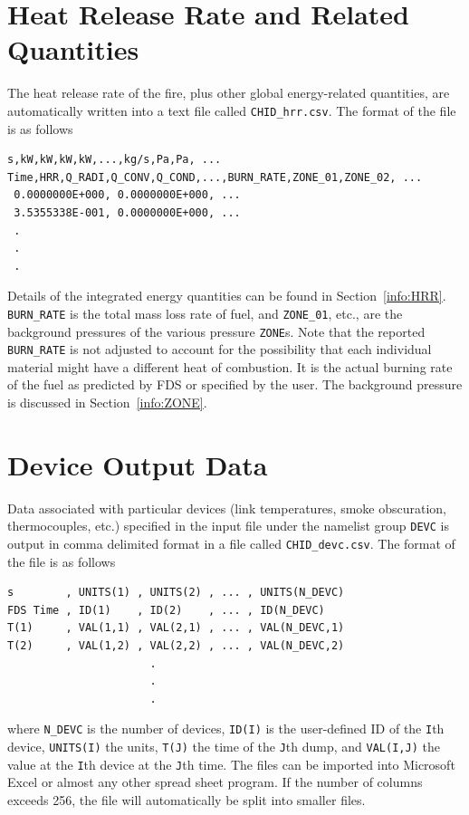 \documentclass[11pt]{book}
\newcommand{\ct}{\tt\small}
\begin{document}
\section{Heat Release Rate and Related Quantities}

\label{out:hrr}
The heat release rate of the fire, plus other global energy-related quantities, are automatically written into a text file
called {\ct CHID\_hrr.csv}. The format of the file is as follows

\footnotesize
\begin{verbatim}
s,kW,kW,kW,kW,...,kg/s,Pa,Pa, ...
Time,HRR,Q_RADI,Q_CONV,Q_COND,...,BURN_RATE,ZONE_01,ZONE_02, ...
 0.0000000E+000, 0.0000000E+000, ...
 3.5355338E-001, 0.0000000E+000, ...
 .
 .
 .
 \end{verbatim}
\normalsize

\noindent
Details of the integrated energy quantities can be found in Section~\ref{info:HRR}.
{\ct BURN\_RATE} is the total mass loss rate of fuel, and {\ct ZONE\_01}, etc., are the background pressures of the various
pressure {\ct ZONE}s. Note that the reported {\ct BURN\_RATE} is not adjusted to account for the possibility that each individual
material might have a different heat of combustion. It is the actual burning rate of the fuel as predicted by FDS or specified by the user.
The background pressure is discussed in Section~\ref{info:ZONE}.





\section{Device Output Data}
\label{out:DEVC}

Data associated with particular devices (link temperatures, smoke obscuration, thermocouples, etc.)
specified in the input file under the namelist
group {\ct DEVC} is output in comma delimited format in a file called
{\ct CHID\_devc.csv}. The format of the file is as follows

\footnotesize
\begin{verbatim}
s        , UNITS(1) , UNITS(2) , ... , UNITS(N_DEVC)
FDS Time , ID(1)    , ID(2)    , ... , ID(N_DEVC)
T(1)     , VAL(1,1) , VAL(2,1) , ... , VAL(N_DEVC,1)
T(2)     , VAL(1,2) , VAL(2,2) , ... , VAL(N_DEVC,2)
                      .
                      .
                      .
\end{verbatim}
\normalsize
where {\ct N\_DEVC} is the number of devices, {\ct ID(I)} is the user-defined
ID of the {\ct I}th device,
{\ct UNITS(I)} the units, {\ct T(J)} the time of the {\ct J}th dump, and
{\ct VAL(I,J)} the value at the {\ct I}th device at the {\ct J}th time.
The files can be imported into Microsoft Excel or almost any other
spread sheet program. If the number of columns exceeds 256, the file will
automatically be split into smaller files.
\end{document}

